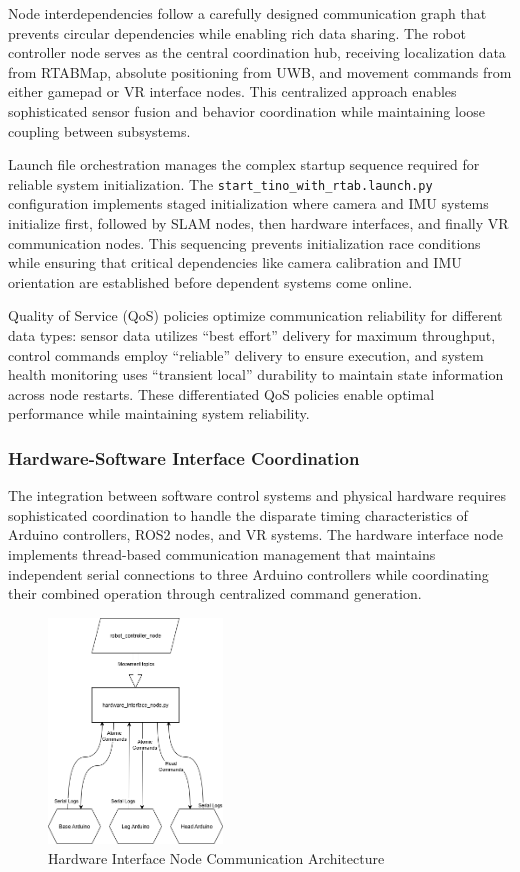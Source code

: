Node interdependencies follow a carefully designed communication graph that prevents circular dependencies while enabling rich data sharing. The robot controller node serves as the central coordination hub, receiving localization data from RTABMap, absolute positioning from UWB, and movement commands from either gamepad or VR interface nodes. This centralized approach enables sophisticated sensor fusion and behavior coordination while maintaining loose coupling between subsystems.

Launch file orchestration manages the complex startup sequence required for reliable system initialization. The \texttt{start\_tino\_with\_rtab.launch.py} configuration implements staged initialization where camera and IMU systems initialize first, followed by SLAM nodes, then hardware interfaces, and finally VR communication nodes. This sequencing prevents initialization race conditions while ensuring that critical dependencies like camera calibration and IMU orientation are established before dependent systems come online.

Quality of Service (QoS) policies optimize communication reliability for different data types: sensor data utilizes ``best effort'' delivery for maximum throughput, control commands employ ``reliable'' delivery to ensure execution, and system health monitoring uses ``transient local'' durability to maintain state information across node restarts. These differentiated QoS policies enable optimal performance while maintaining system reliability.

\subsubsection{Hardware-Software Interface Coordination}

The integration between software control systems and physical hardware requires sophisticated coordination to handle the disparate timing characteristics of Arduino controllers, ROS2 nodes, and VR systems. The hardware interface node implements thread-based communication management that maintains independent serial connections to three Arduino controllers while coordinating their combined operation through centralized command generation.

\begin{figure}[H]
    \centering
    \includegraphics[height=6cm]{Images/HardwareNodeInteraction.png}
    \caption{Hardware Interface Node Communication Architecture}
    \label{fig:hardware_node_interaction}
\end{figure}

